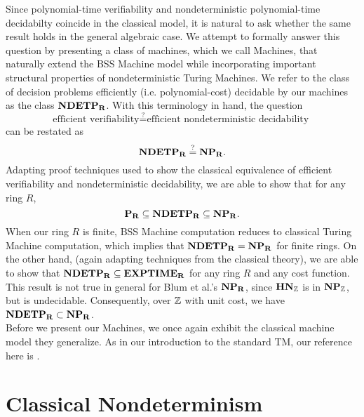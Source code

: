Since polynomial-time verifiability and nondeterministic
polynomial-time decidabilty coincide in the classical model, it is
natural to ask whether the same result holds in the general algebraic
case.  We attempt to formally answer this question by presenting a
class of machines, which we call \ndet Machines, that naturally extend
the BSS Machine model while incorporating important structural
properties of nondeterministic Turing Machines.  We refer to the class
of decision problems efficiently (i.e. polynomial-cost) decidable by
our machines as the class $\mathbf{NDETP_R}$.  With this terminology in hand,
the question
$$\text{efficient verifiability} \stackrel{?}{=} \text{efficient nondeterministic decidability }$$
can be restated as
$$\mathbf{NDETP_R} \stackrel{?}{=} \mathbf{NP_R} .$$
Adapting proof techniques used to show the classical equivalence of
efficient verifiability and nondeterministic decidability, we are able
to show that for any ring $R$,
$$\mathbf{P_R} \subseteq \mathbf{NDETP_R} \subseteq \mathbf{NP_R}.$$
When our ring $R$ is finite, BSS Machine computation reduces to
classical Turing Machine computation, which implies that $\mathbf{NDETP_R} =
\mathbf{NP_R}$ for finite rings.  On the other hand, (again adapting techniques
from the classical theory), we are able to show that $\mathbf{NDETP_R} \subseteq
\mathbf{EXPTIME_R}$ for any ring $R$ and any cost function.  This result is not
true in general for Blum et al.'s $\mathbf{NP_R}$, since $\mathbf{HN}_{\mathbb{Z}}$ is in
$\mathbf{NP_{\mathbb{Z}}}$, but is undecidable.  Consequently, over
$\mathbb{Z}$ with unit cost, we have $\mathbf{NDETP_R} \subset \mathbf{NP_R}$.\\

Before we present our \ndet Machines, we once again exhibit the
classical machine model they generalize.  As in our introduction to
the standard TM, our reference here is \cite{S06}.

\section{Classical Nondeterminism}


